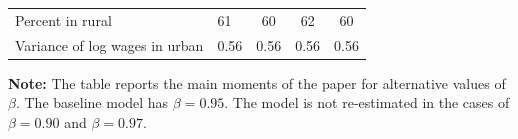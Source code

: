 \documentclass[12pt,pdftex]{article}
\begin{document}
\begin{table}[!htb]
\begin{center}
\begin{tabular}{l l c c c}
Percent in rural                                            & \phantom{0.}61    & \phantom{0.}60    & \phantom{0.}62    & \phantom{0.}60    \\
Variance of log wages in urban                              & 0.56              & 0.56              &  0.56             &   0.56             \\
\hline
\hline
\end{tabular}
\parbox[c]{6.5in}{%
{\footnotesize  \vspace{0.3cm} \textbf{Note:} The table reports the main moments of the paper for alternative values of $\beta$. The baseline model has $\beta=0.95$. The model is not re-estimated in the cases of $\beta=0.90$ and $\beta=0.97$.}
}
\end{center}
\end{table}
\end{document}
